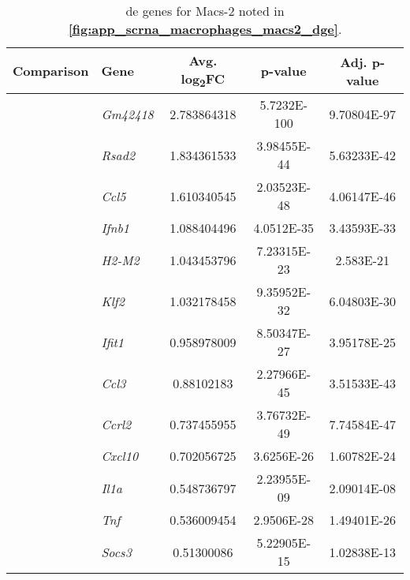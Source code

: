 \begin{table}[ht!]
  \renewcommand{\arraystretch}{1.2} %
  \centering
 \caption[ genes in Macs-2 sub-population from  data]{\gls{de} genes for Macs-2 noted in \textbf{\autoref{fig:app_scrna_macrophages_macs2_dge}}.}
     \label{tab:app_scrna_macs2_dge}
  \begin{tabularx}{\textwidth}{xxCCC}
    \toprule
    \textbf{Comparison} & \textbf{Gene} & \textbf{Avg. log\textsubscript{2}FC} & \textbf{p-value} & \textbf{Adj. p-value} \\
    \midrule
     & \textit{Gm42418} & 2.783864318 &	\num{5.7232E-100} &	\num{9.70804E-97} \\
     & \textit{Rsad2} & 1.834361533 &	\num{3.98455E-44} &	\num{5.63233E-42} \\
     & \textit{Ccl5} & 1.610340545 &	\num{2.03523E-48} & \num{4.06147E-46}	 \\
     & \textit{Ifnb1} & 1.088404496 &	\num{4.0512E-35} &	\num{3.43593E-33} \\
     & \textit{H2-M2} & 1.043453796 &	\num{7.23315E-23} &	\num{2.583E-21} \\
     & \textit{Klf2} & 1.032178458 & \num{9.35952E-32} & \num{6.04803E-30}	 \\
     & \textit{Ifit1} & 0.958978009 &	\num{8.50347E-27} & \num{3.95178E-25}	 \\
     & \textit{Ccl3} & 0.88102183 &	\num{2.27966E-45} & \num{3.51533E-43}	 \\
     & \textit{Ccrl2} &	0.737455955 &	\num{3.76732E-49} & \num{7.74584E-47}	 \\
     & \textit{Cxcl10} & 0.702056725 &	\num{3.6256E-26} & \num{1.60782E-24} \\
     & \textit{Il1a} & 0.548736797 &	\num{2.23955E-09} &	\num{2.09014E-08} \\
     & \textit{Tnf} &	0.536009454 &	\num{2.9506E-28} &	\num{1.49401E-26} \\
     & \textit{Socs3} & 0.51300086 &	\num{5.22905E-15} &	\num{1.02838E-13} \\
     
     \midrule


\end{tabularx}
\end{table}
